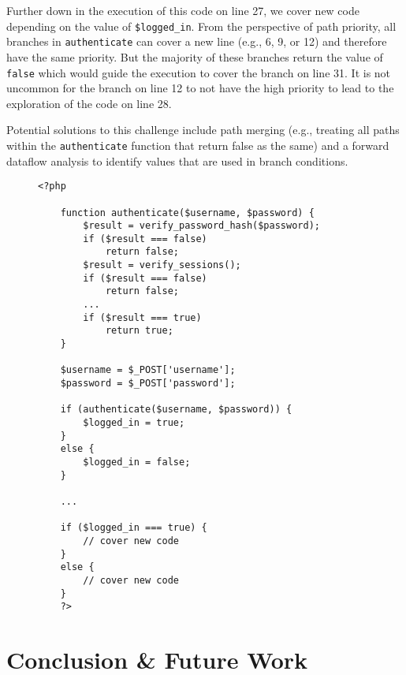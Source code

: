 Further down in the execution of this code on line 27, we cover new code depending on the value of \texttt{\$logged\_in}. 
From the perspective of path priority, all branches in \texttt{authenticate} can cover a new line (e.g., 6, 9, or 12) and therefore have the same priority. 
But the majority of these branches return the value of \texttt{false} which would guide the execution to cover the branch on line 31. 
It is not uncommon for the branch on line 12 to not have the high priority to lead to the exploration of the code on line 28. 

Potential solutions to this challenge include path merging (e.g., treating all paths within the \texttt{authenticate} function that return false as the same) and a forward dataflow analysis to identify values that are used in branch conditions. 



\begin{figure}[t]
    \begin{lstlisting}[frame=single, caption={Demonstrating symbolic branches that affect the code coverage in later parts of the code},captionpos=b, label={listing:path_explosion}]
    <?php

    function authenticate($username, $password) {
        $result = verify_password_hash($password);
        if ($result === false) 
            return false;
        $result = verify_sessions();
        if ($result === false) 
            return false;
        ...
        if ($result === true)
            return true;
    }

    $username = $_POST['username'];
    $password = $_POST['password'];

    if (authenticate($username, $password)) {
        $logged_in = true;
    }
    else {
        $logged_in = false;
    }

    ...

    if ($logged_in === true) {
        // cover new code
    }
    else {
        // cover new code
    }
    ?>
    \end{lstlisting}
\end{figure}

\section{Conclusion \& Future Work}

